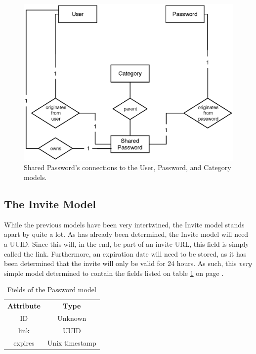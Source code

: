 			\begin{figure}[p]
				\centering
				\includegraphics[scale=0.75]{figures/design/uml/erd/user-category-password-sharedpassword.eps}
				\caption{Shared Password's connections to the User, Password, and Category models.}
				\label{fig:relationship:sharedpassword}
			\end{figure}

		\subsection{The Invite Model}
			While the previous models have been very intertwined, the Invite model stands apart by quite a lot. As has already been determined, the Invite model will need a UUID. Since this will, in the end, be part of an invite URL, this field is simply called the link. Furthermore, an expiration date will need to be stored, as it has been determined that the invite will only be valid for 24 hours. As such, this \emph{very} simple model determined to contain the fields listed on table \ref{fig:model:invite} on page \pageref{fig:model:invite}. 
			
			\begin{table}[p]
				\centering
				\begin{tabular}{c|c}
					\textbf{Attribute} 		& \textbf{Type} 		\\
					ID 						& Unknown 		\\
					link  					& UUID \\
					expires 				& Unix timestamp \\
				\end{tabular}
				\caption{Fields of the Password model}
				\label{fig:model:invite}
			\end{table}

